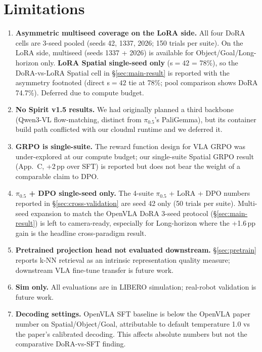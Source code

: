 \documentclass{article}
\begin{document}
\section{Limitations}\label{sec:limitations}

\begin{enumerate}
  \item \textbf{Asymmetric multiseed coverage on the LoRA side.} All four DoRA cells are 3-seed pooled (seeds 42, 1337, 2026; 150 trials per suite). On the LoRA side, multiseed (seeds 1337 + 2026) is available for Object/Goal/Long-horizon only. \textbf{LoRA Spatial single-seed only} (s\(=42\) = 78\%), so the DoRA-vs-LoRA Spatial cell in \S\ref{sec:main-result} is reported with the asymmetry footnoted (direct s\(=42\) tie at 78\%; pool comparison shows DoRA 74.7\%). Deferred due to compute budget.
  \item \textbf{No Spirit v1.5 results.} We had originally planned a third backbone (Qwen3-VL flow-matching, distinct from \(\pi_{0.5}\)'s PaliGemma), but its container build path conflicted with our cloudml runtime and we deferred it.
  \item \textbf{GRPO is single-suite.} The reward function design for VLA GRPO was under-explored at our compute budget; our single-suite Spatial GRPO result (App.~C, +2\,pp over SFT) is reported but does not bear the weight of a comparable claim to DPO.
  \item \textbf{\(\pi_{0.5}\) + DPO single-seed only.} The 4-suite \(\pi_{0.5}\) + LoRA + DPO numbers reported in \S\ref{sec:cross-validation} are seed 42 only (50 trials per suite). Multi-seed expansion to match the OpenVLA DoRA 3-seed protocol (\S\ref{sec:main-result}) is left to camera-ready, especially for Long-horizon where the +1.6\,pp gain is the headline cross-paradigm result.
  \item \textbf{Pretrained projection head not evaluated downstream.} \S\ref{sec:pretrain} reports k-NN retrieval as an intrinsic representation quality measure; downstream VLA fine-tune transfer is future work.
  \item \textbf{Sim only.} All evaluations are in LIBERO simulation; real-robot validation is future work.
  \item \textbf{Decoding settings.} OpenVLA SFT baseline is below the OpenVLA paper number on Spatial/Object/Goal, attributable to default temperature 1.0 vs the paper's calibrated decoding. This affects absolute numbers but not the comparative DoRA-vs-SFT finding.
\end{enumerate}
\end{document}
